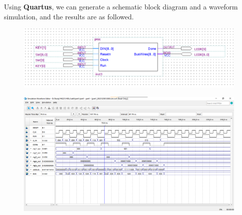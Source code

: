 Using \textbf{Quartus}, we can generate a schematic block diagram and a waveform simulation, and the results are as followed.

\begin{figure}[h]
    \centering
    \includegraphics[scale = 0.5]{source/picture/Lab09/Lab9_1.png}
\end{figure}
\clearpage
\begin{figure}[h]
    \centering
    \includegraphics[width = \textwidth]{source/picture/Lab09/Lab9_1_stimulation.png}
\end{figure}

